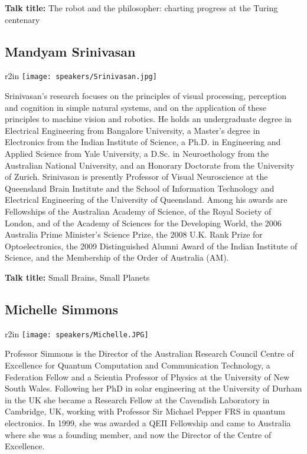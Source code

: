 \bigskip
{\bf Talk title:} The robot and the philosopher: charting progress at the Turing centenary

\subsection*{Mandyam Srinivasan}
\begin{wrapfigure}{r}{2in}
\centering
\texttt{[image: speakers/Srinivasan.jpg]}
\end{wrapfigure}Srinivasan's research focuses on the principles of visual processing, perception and cognition in
simple natural systems, and on the application of these principles to machine vision and robotics.
He holds an undergraduate degree in Electrical Engineering from Bangalore University, a Master's
degree in Electronics from the Indian Institute of Science, a Ph.D. in Engineering and Applied
Science from Yale University, a D.Sc. in Neuroethology from the Australian National University,
and an Honorary Doctorate from the University of Zurich. Srinivasan is presently Professor of
Visual Neuroscience at the Queensland Brain Institute and the School of Information Technology
and Electrical Engineering of the University of Queensland. Among his awards are Fellowships
of the Australian Academy of Science, of the Royal Society of London, and of the Academy of
Sciences for the Developing World, the 2006 Australia Prime Minister’s Science Prize, the 2008
U.K. Rank Prize for Optoelectronics, the 2009 Distinguished Alumni Award of the Indian Institute
of Science, and the Membership of the Order of Australia (AM).

\bigskip
{\bf Talk title:} Small Brains, Small Planets


\newpage

\subsection*{Michelle Simmons}
\begin{wrapfigure}{r}{2in}
\centering
\texttt{[image: speakers/Michelle.JPG]}
\end{wrapfigure}Professor Simmons is the Director of the Australian Research Council Centre of Excellence for
Quantum Computation and Communication Technology, a Federation Fellow and a Scientia
Professor of Physics at the University of New South Wales. Following her PhD in solar engineering
at the University of Durham in the UK she became a Research Fellow at the Cavendish Laboratory in
Cambridge, UK, working with Professor Sir Michael Pepper FRS in quantum electronics. In 1999, she
was awarded a QEII Fellowship and came to Australia where she was a founding member, and now
the Director of the Centre of Excellence.

